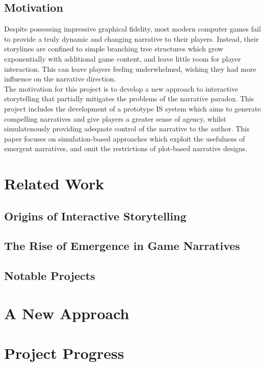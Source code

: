 \documentclass{article}
\begin{document}
\subsection{Motivation}

Despite possessing impressive graphical fidelity, most modern computer games fail to provide a truly dynamic and changing narrative to their players. Instead, their storylines are confined to simple branching tree structures which grow exponentially with additional game content, and leave little room for player interaction. This can leave players feeling underwhelmed, wishing they had more influence on the narrative direction.\\

\noindent The motivation for this project is to develop a new approach to interactive storytelling that partially mitigates the problems of the narrative paradox. This project includes the development of a prototype IS system which aims to generate compelling narratives and give players a greater sense of agency, whilst simulatenously providing adequate control of the narrative to the author. This paper focuses on simulation-based approaches which exploit the usefulness of emergent narratives, and omit the restrictions of plot-based narrative designs.

\section{Related Work}

\subsection{Origins of Interactive Storytelling}

\subsection{The Rise of Emergence in Game Narratives}

\subsection{Notable Projects}

\section{A New Approach}

\section{Project Progress}
\end{document}
